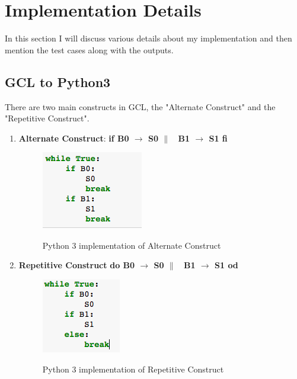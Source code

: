 \documentclass[18pt]{extarticle}
\begin{document}
\section*{Implementation Details}
 In this section I will discuss various details about my implementation and then mention the test cases along with the outputs.
 \subsection*{GCL to Python3}
 There are two main constructs in GCL, the "Alternate Construct" and the "Repetitive Construct".
 \begin{enumerate}
 \item \textbf{Alternate Construct}: \textbf{if B0 $\rightarrow$ S0 $\|$ \ B1 $\rightarrow$ S1 fi}
 \begin{figure}[h]
  \centering
  \includegraphics[scale=0.6]{ac}
  \label{fig:  if-fi}
 \caption{Python 3 implementation of Alternate Construct}
\end{figure}
\item \textbf{Repetitive Construct} \textbf{do B0 $\rightarrow$ S0 $\|$ \ B1 $\rightarrow$ S1 od}
\begin{figure}[h]
  \centering
  \includegraphics[scale=0.7]{rc}
  \label{fig:  do-od}
 \caption{Python 3 implementation of Repetitive Construct}
\end{figure}
\end{enumerate}
\end{document}
